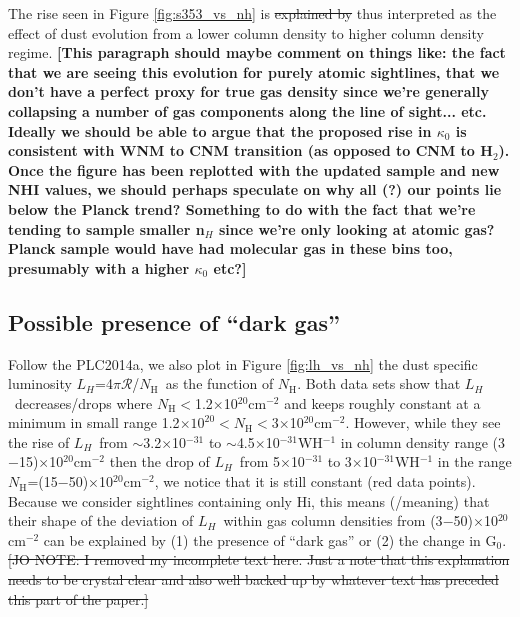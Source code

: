 \documentclass[preprint]{emulateapj}
\def\hi{H{\sc i}}
\def\LH{$L_{H}$}
\def\NH{$N_\mathrm{H}$}
\def\s{s$^{-1}$}
\def\s353{$\sigma_{353}$}
\def\rad{$\mathcal{R}$}
\begin{document}
The rise seen in Figure \ref{fig:s353_vs_nh} is \sout{explained by} {\color{magenta}thus interpreted as the effect of} dust evolution from a lower column density to higher column density regime. \textbf{\color{magenta} [This paragraph should maybe comment on things like: the fact that we are seeing this evolution for purely atomic sightlines, that we don't have a perfect proxy for true gas density since we're generally collapsing a number of gas components along the line of sight... etc. Ideally we should be able to argue that the proposed rise in $\kappa_0$ is consistent with WNM to CNM transition (as opposed to CNM to H$_2$). Once the figure has been replotted with the updated sample and new NHI values, we should perhaps speculate on why all (?) our points lie below the Planck trend? Something to do with the fact that we're tending to sample smaller n$_H$ since we're only looking at atomic gas? Planck sample would have had molecular gas in these bins too, presumably with a higher $\kappa_0$ etc?]}


\subsection{ Possible presence of ``dark gas''}
\label{subsec:possible-dark-gas}

Follow the PLC2014a, we also plot in Figure \ref{fig:lh_vs_nh} the dust specific luminosity \LH=4$\pi$\rad/\NH\ as the function of \NH. Both data sets show that \LH\ decreases/drops where \NH$<$1.2$\times$10$^{20}$cm$^{-2}$ and keeps roughly constant at a minimum in small range 1.2$\times$$10^{20}$$<$\NH$<$3$\times$10$^{20}$cm$^{-2}$. However, while they see the rise of \LH\ from $\sim$3.2$\times$10$^{-31}$ to $\sim$4.5$\times$10$^{-31}$WH$^{-1}$ in column density range (3$-$15)$\times$10$^{20}$cm$^{-2}$ then the drop of \LH\ from 5$\times$10$^{-31}$ to 3$\times$10$^{-31}$WH$^{-1}$ in the range \NH=(15$-$50)$\times$10$^{20}$cm$^{-2}$, we notice that it is still constant (red data points). Because we consider sightlines containing only \hi, this means (/meaning) that their shape of the deviation of \LH\ within gas column densities from (3$-$50)$\times$10$^{20}$cm$^{-2}$ can be explained by (1) the presence of ``dark gas'' or (2) the change in G$_{0}$. \sout{\color{red}[JO NOTE: I removed my incomplete text here. Just a note that this explanation needs to be crystal clear and also well backed up by whatever text has preceded this part of the paper.]}
\end{document}
